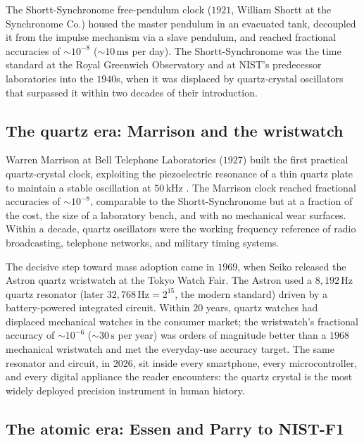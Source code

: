 The Shortt-Synchronome free-pendulum clock ($1921$, William Shortt
at the Synchronome Co.) housed the master pendulum in an
evacuated tank, decoupled it from the impulse mechanism via a
slave pendulum, and reached fractional accuracies of $\sim 10^{-8}
$ ($\sim 10 \,\si{\milli\second}$ per day). The Shortt-Synchronome
was the time standard at the Royal Greenwich Observatory and at
NIST's predecessor laboratories into the $1940$s, when it was
displaced by quartz-crystal oscillators that surpassed it within
two decades of their introduction.

\subsection{The quartz era: Marrison and the wristwatch}

Warren Marrison at Bell Telephone Laboratories ($1927$) built the
first practical quartz-crystal clock, exploiting the
piezoelectric resonance of a thin quartz plate to maintain a
stable oscillation at $50 \,\si{\kilo\hertz}$
\cite{paper:ch06t3-marrison-1948}. The Marrison clock reached
fractional accuracies of $\sim 10^{-8}$, comparable to the
Shortt-Synchronome but at a fraction of the cost, the size of a
laboratory bench, and with no mechanical wear surfaces. Within a
decade, quartz oscillators were the working frequency reference
of radio broadcasting, telephone networks, and military timing
systems.

The decisive step toward mass adoption came in $1969$, when Seiko
released the Astron quartz wristwatch at the Tokyo Watch Fair.
The Astron used a $8{,}192 \,\si{\hertz}$ quartz resonator (later
$32{,}768 \,\si{\hertz} = 2^{15}$, the modern standard) driven by
a battery-powered integrated circuit. Within $20$ years, quartz
watches had displaced mechanical watches in the consumer market;
the wristwatch's fractional accuracy of $\sim 10^{-6}$ ($\sim 30
\,\si{\second}$ per year) was orders of magnitude better than a
$1968$ mechanical wristwatch and met the everyday-use accuracy
target. The same resonator and circuit, in $2026$, sit inside
every smartphone, every microcontroller, and every digital
appliance the reader encounters: the quartz crystal is the most
widely deployed precision instrument in human history.

\subsection{The atomic era: Essen and Parry to NIST-F1}

